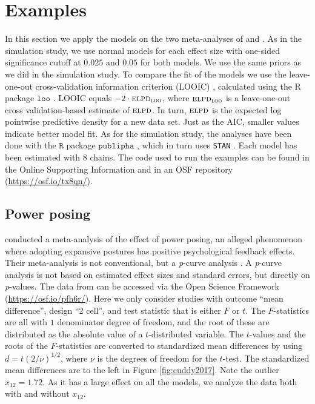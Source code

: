 \documentclass[useAMS,usenatbib,referee]{biom}
\renewcommand{\sqrt}[1]{(#1)^{1/2}}
\begin{document}



\section{Examples}\label{sect:examples}
In this section we apply the models on the two meta-analyses of \citet{cuddy2018p} and \citet{anderson2010violent}. As in the simulation study, we use normal models for each effect size with one-sided significance cutoff at $0.025$ and $0.05$ for both models. We use the same priors as we did in the simulation study. To compare the fit of the models we use the leave-one-out cross-validation information criterion (\textsc{LOOIC}) \citep{loo_article}, calculated using the R package $\mathtt{loo}$ \citep{loo}. LOOIC equals $-2\cdot\textsc{elpd}_{\textsc{loo}}$, where $\textsc{elpd}_\textsc{loo}$ is a leave-one-out cross validation-based estimate of $\textsc{elpd}$. In turn, $\textsc{elpd}$ is the expected log pointwise predictive density for a new data set. 
Just as the \textsc{AIC}, smaller values indicate better model fit. As for the simulation study, the analyses have been done with the $\mathtt{R}$ package $\mathtt{publipha}$ \citep{publipha}, which in turn uses \texttt{STAN} \citep{Carpenter2017-cf}. Each model has been estimated with $8$ chains. The code used to run the examples can be found in the Online Supporting Information and in an OSF repository (\url{https://osf.io/tx8qn/}).


\subsection{Power posing\label{subsec:cuddy2018}}

\citet{cuddy2018p} conducted a meta-analysis of the effect of power posing, an alleged phenomenon where adopting expansive postures has positive psychological feedback effects. Their meta-analysis is not conventional, but a \textit{p}-curve analysis \citep{simonsohn2014p}. A \textit{p}-curve analysis is not based on estimated effect sizes and standard errors, but directly on \textit{p}-values. The data from \citet{cuddy2018p} can be accessed via the Open Science Framework (\url{https://osf.io/pfh6r/}). Here we only consider studies with outcome \enquote{mean difference}, design \enquote{2 cell}, and test statistic that is either $F$ or $t$. The $F$-statistics are all with $1$ denominator degree of freedom, and the root of these are distributed as the absolute value of a $t$-distributed variable. The $t$-values and the roots of the $F$-statistics are converted to standardized mean differences by using $d = t\sqrt{2/\nu}$, where $\nu$ is the degrees of freedom for the $t$-test. The standardized mean differences are to the left in Figure \ref{fig:cuddy2017}. Note the outlier $x_{12} = 1.72$. As it has a large effect on all the models, we analyze the data both with and without $x_{12}$.
\end{document}
